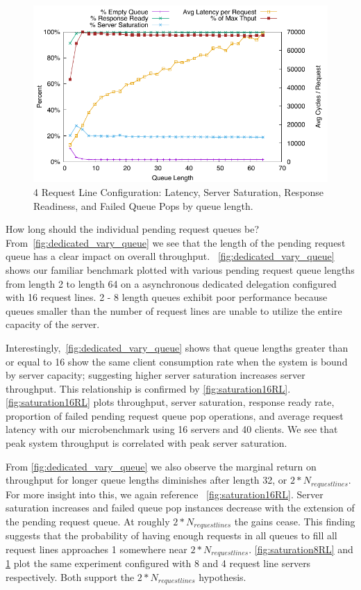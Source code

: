 \documentclass{uicthesi}
\begin{document}
\begin{figure}[ht!]
\centering
\includegraphics[width=0.9\columnwidth]{FIG/4rldedicated_saturation.pdf}
\caption{4 Request Line Configuration: Latency, Server Saturation, Response Readiness, and Failed Queue Pops by queue length.}
\label{fig:saturation4RL}
\end{figure}

How long should the individual pending request queues be? From~\ref{fig:dedicated_vary_queue} we see that the length of the pending request queue has a clear impact on overall throughput. ~\ref{fig:dedicated_vary_queue} shows our familiar benchmark plotted with various pending request queue lengths from length 2 to length 64 on a asynchronous dedicated delegation configured with 16 request lines. 2 - 8 length queues exhibit poor performance because queues smaller than the number of request lines are unable to utilize the entire capacity of the server. 

Interestingly,~\ref{fig:dedicated_vary_queue} shows that queue lengths greater than or equal to 16 show the same client consumption rate when the system is bound by server capacity; suggesting higher server saturation increases server throughput.  This relationship is confirmed by \ref{fig:saturation16RL}. \ref{fig:saturation16RL} plots throughput, server saturation, response ready rate, proportion of failed pending request queue pop operations, and average request latency with our microbenchmark using 16 servers and 40 clients. We see that peak system throughput is correlated with peak server saturation. 

From \ref{fig:dedicated_vary_queue} we also observe the marginal return on throughput for longer queue lengths diminishes after length 32, or $2 * N_{request lines}$. For more insight into this, we again reference ~\ref{fig:saturation16RL}. Server saturation increases and failed queue pop instances decrease with the extension of the pending request queue. At roughly $2 * N_{request lines}$ the gains cease. This finding suggests that the probability of having enough requests in all queues to fill all request lines approaches 1 somewhere near $2 * N_{request lines}$. \ref{fig:saturation8RL} and \ref{fig:saturation4RL} plot the same experiment configured with 8 and 4 request line servers respectively. Both support the $2 * N_{request lines}$ hypothesis. 
\end{document}
